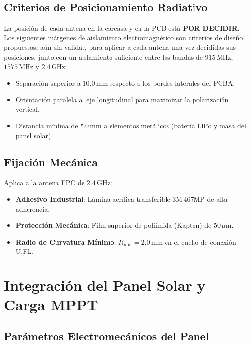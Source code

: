 \subsection{Criterios de Posicionamiento Radiativo}

La posición de cada antena en la carcasa y en la PCB está \textbf{POR DECIDIR}. Los siguientes márgenes de aislamiento electromagnético son criterios de diseño propuestos, aún sin validar, para aplicar a cada antena una vez decididas sus posiciones, junto con un aislamiento suficiente entre las bandas de $915\,\text{MHz}$, $1575\,\text{MHz}$ y $2.4\,\text{GHz}$:

\begin{itemize}[leftmargin=*]
    \item Separación superior a $10.0\,\text{mm}$ respecto a los bordes laterales del PCBA.
    \item Orientación paralela al eje longitudinal para maximizar la polarización vertical.
    \item Distancia mínima de $5.0\,\text{mm}$ a elementos metálicos (batería LiPo y masa del panel solar).
\end{itemize}

\subsection{Fijación Mecánica}

Aplica a la antena FPC de $2.4\,\text{GHz}$:

\begin{itemize}[leftmargin=*]
    \item \textbf{Adhesivo Industrial}: Lámina acrílica transferible $3\text{M}\,467\text{MP}$ de alta adherencia.
    \item \textbf{Protección Mecánica}: Film superior de poliimida (Kapton) de $50\,\mu\text{m}$.
    \item \textbf{Radio de Curvatura Mínimo}: $R_{\text{mín}} = 2.0\,\text{mm}$ en el cuello de conexión U.FL.
\end{itemize}

\section{Integración del Panel Solar y Carga MPPT}

\subsection{Parámetros Electromecánicos del Panel}

